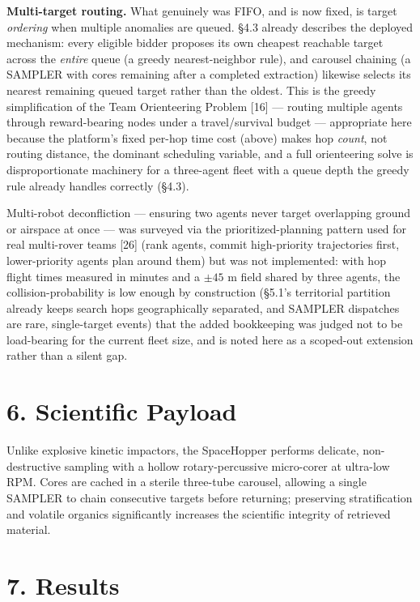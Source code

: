 \documentclass[conference]{IEEEtran}
\begin{document}
\textbf{Multi-target routing.} What genuinely was FIFO, and is now fixed, is target \emph{ordering} when multiple anomalies are queued. \S4.3 already describes the deployed mechanism: every eligible bidder proposes its own cheapest reachable target across the \emph{entire} queue (a greedy nearest-neighbor rule), and carousel chaining (a SAMPLER with cores remaining after a completed extraction) likewise selects its nearest remaining queued target rather than the oldest. This is the greedy simplification of the Team Orienteering Problem [16] --- routing multiple agents through reward-bearing nodes under a travel/survival budget --- appropriate here because the platform's fixed per-hop time cost (above) makes hop \emph{count}, not routing distance, the dominant scheduling variable, and a full orienteering solve is disproportionate machinery for a three-agent fleet with a queue depth the greedy rule already handles correctly (\S4.3).

Multi-robot deconfliction --- ensuring two agents never target overlapping ground or airspace at once --- was surveyed via the prioritized-planning pattern used for real multi-rover teams [26] (rank agents, commit high-priority trajectories first, lower-priority agents plan around them) but was not implemented: with hop flight times measured in minutes and a $\pm45$ m field shared by three agents, the collision-probability is low enough by construction (\S5.1's territorial partition already keeps search hops geographically separated, and SAMPLER dispatches are rare, single-target events) that the added bookkeeping was judged not to be load-bearing for the current fleet size, and is noted here as a scoped-out extension rather than a silent gap.

\section*{6. Scientific Payload}

Unlike explosive kinetic impactors, the SpaceHopper performs delicate, non-destructive sampling with a hollow rotary-percussive micro-corer at ultra-low RPM. Cores are cached in a sterile three-tube carousel, allowing a single SAMPLER to chain consecutive targets before returning; preserving stratification and volatile organics significantly increases the scientific integrity of retrieved material.

\section*{7. Results}
\end{document}
